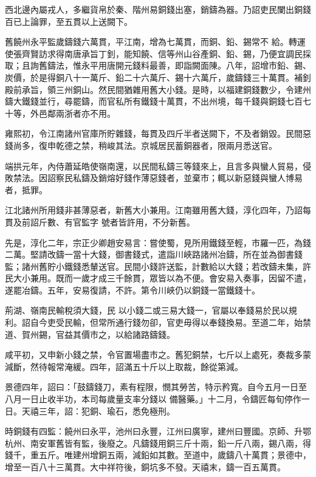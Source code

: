\begin{pinyinscope}
 西北邊內屬戎人，多繼貨帛於秦、階州易銅錢出塞，銷鑄為器。乃詔吏民闌出銅錢百已上論罪，至五貫以上送闕下。



 舊饒州永平監歲鑄錢六萬貫，平江南，增為七萬貫，而銅、鉛、錫常不
 給。轉運使張齊賢訪求得南唐承旨丁釗，能知饒、信等州山谷產銅、鉛、錫，乃便宜調民採取；且詢舊鑄法，惟永平用唐開元錢料最善，即詣闕面陳。八年，詔增市鉛、錫、炭價，於是得銅八十一萬斤、鉛二十六萬斤、錫十六萬斤，歲鑄錢三十萬貫。補釗殿前承旨，領三州銅山。然民間猶雜用舊大小錢。是時，以福建銅錢數少，令建州鑄大鐵錢並行，尋罷鑄，而官私所有鐵錢十萬貫，不出州境，每千錢與銅錢七百七十等，外邑鄰兩浙者亦不用。



 雍熙初，令江南諸州官庫所貯雜錢，每貫及四斤半者送闕下，不及者銷毀。民間惡錢尚多，復申乾德之禁，稍峻其法。京城居民蓄銅器者，限兩月悉送官。



 端拱元年，內侍蕭延皓使嶺南還，以民間私鑄三等錢來上，且言多與蠻人貿易，侵敗禁法。因詔察民私鑄及銷熔好錢作薄惡錢者，並棄市；輒以新惡錢與蠻人博易者，抵罪。



 江北諸州所用錢非甚薄惡者，新舊大小兼用。江南雖用舊大錢，淳化四年，乃詔每貫及前詔斤數、有官監字
 號者皆許用，不分新舊。



 先是，淳化二年，宗正少卿趙安易言：嘗使蜀，見所用鐵錢至輕，市羅一匹，為錢二萬。堅請改鑄一當十大錢，御書錢式，遣詣川峽路諸州冶鑄，所在並為御書錢監；諸州舊貯小鐵錢悉輦送官。民間小錢許送監，計數給以大錢；若改鑄未集，許民大小兼用。既而一歲才成三千餘貫，眾皆以為不便。會安易入奏事，因留不遣，遂罷冶鑄。五年，安易復請，不許。第令川峽仍以銅錢一當鐵錢十。



 荊湖、嶺南民輸稅須大錢，民
 以小錢二或三易大錢一，官屬以奉錢易於民以規利。詔自今吏受民輸，但常所通行錢勿卻，官吏毋得以奉錢換易。至道二年，始禁道、賀州錫，官益其價市之，以給諸路鑄錢。



 咸平初，又申新小錢之禁，令官置場盡市之。舊犯銅禁，七斤以上處死，奏裁多蒙減斷，然待報常淹緩。四年，詔滿五十斤以上取裁，餘從第減。



 景德四年，詔曰：「鼓鑄錢刀，素有程限，憫其勞苦，特示矜寬。自今五月一日至八月一日止收半功，本司每歲量支率分錢以
 備醫藥。」十二月，令鑄匠每旬停作一日。天禧三年，詔：犯銅、瑜石，悉免極刑。



 時銅錢有四監：饒州曰永平，池州曰永豐，江州曰廣寧，建州曰豐國。京師、升鄂杭州、南安軍舊皆有監，後廢之。凡鑄錢用銅三斤十兩，鉛一斤八兩，錫八兩，得錢千，重五斤。唯建州增銅五兩，減鉛如其數。至道中，歲鑄八十萬貫；景德中，增至一百八十三萬貫。大中祥符後，銅坑多不發。天禧末，鑄一百五萬貫。




\end{pinyinscope}
